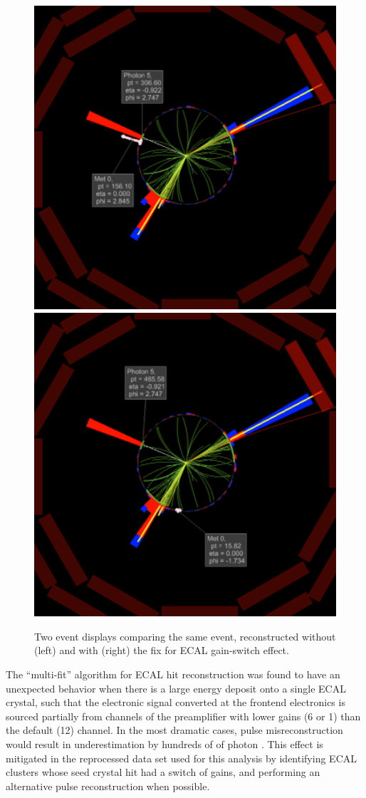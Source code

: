 \begin{figure}[htbp]
  \centering
  \includegraphics[width=0.48\linewidth]{Reconstruction/Figures/gsfix/evdisp_before.pdf}
  \includegraphics[width=0.48\linewidth]{Reconstruction/Figures/gsfix/evdisp_after.pdf}
  \caption{
    Two event displays comparing the same event, reconstructed without (left) and with (right) the fix for ECAL gain-switch effect.
  }
  \label{fig:eventdisplay_gsfix}
\end{figure}

The ``multi-fit'' algorithm for ECAL hit reconstruction was found to have an unexpected behavior when there is a large energy deposit onto a single ECAL crystal, such that the electronic signal converted at the frontend electronics is sourced partially from channels of the preamplifier with lower gains (6 or 1) than the default (12) channel. 
In the most dramatic cases, pulse misreconstruction would result in underestimation by hundreds of \GeV of photon \pt. 
This effect is mitigated in the reprocessed data set used for this analysis by identifying ECAL clusters whose seed crystal hit had a switch of gains, and performing an alternative pulse reconstruction when possible.

